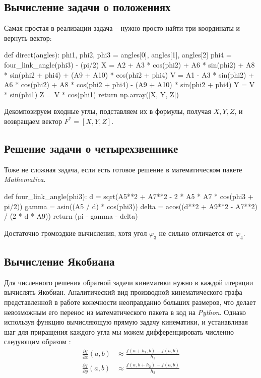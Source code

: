 \subsection{Вычисление задачи о положениях}

Самая простая в реализации задача -- нужно просто найти три координаты и вернуть вектор:
\begin{python}
def direct(angles):
    phi1, phi2, phi3 = angles[0], angles[1], angles[2]
    phi4 = four_link_angle(phi3) - (pi/2)
    X = A2 + A3 * cos(phi2) + A6 * sin(phi2) + A8 * sin(phi2 + phi4) + (A9 + A10) * cos(phi2 + phi4)
    V = A1 - A3 * sin(phi2) + A6 * cos(phi2) + A8 * cos(phi2 + phi4) - (A9 + A10) * sin(phi2 + phi4)
    Y = V * sin(phi1)
    Z = V * cos(phi1)
    return np.array([X, Y, Z])
\end{python}

\noindent Декомпозируем входные углы, подставляем их в формулы, получая $ X, Y, Z $, и возвращаем вектор $ F^* =[ X, Y, Z ] $.

\subsection{Решение задачи о четырехзвеннике}
Тоже не сложная задача, если есть готовое решение в математическом пакете \textit{Mathematica}.
\begin{python}
def four_link_angle(phi3):
    d = sqrt(A5**2 + A7**2 - 2 * A5 * A7 * cos(phi3 + pi/2))
    gamma = asin((A5 / d) * cos(phi3))
    delta = acos((d**2 + A9**2 - A7**2) / (2 * d * A9))
    return (pi - gamma - delta)
\end{python}

\noindent Достаточно громоздкие вычисления, хотя угол $ \varphi_3 $ не сильно отличается от $ \varphi_4 $.

\subsection{Вычисление Якобиана}
Для численного решения обратной задачи кинематики нужно в каждой итерации вычислять Якобиан. Аналитический вид производной кинематического графа представленной в работе конечности неоправданно больших размеров, что делает невозможным его перенос из математического пакета в код на \textit{Python}. Однако используя функцию вычисляющую прямую задачу кинематики, и устанавливая шаг для приращения каждого угла мы можем дифференцировать численно следующим образом \cite{Morken2010}:
\begin{align*}
    \frac{\partial f}{\partial x}(a, b) &\approx \frac{f(a+h_1, b) - f(a, b)}{h_1} \\ 
    \frac{\partial f}{\partial y}(a, b) &\approx \frac{f(a, b+h_2) - f(a, b)}{h_2}
\end{align*}

